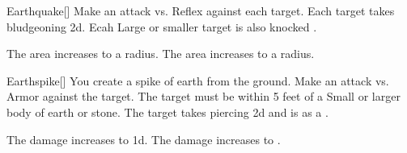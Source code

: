 \lowercase{\hypertarget{spell:Earthquake}{}}\label{spell:Earthquake}
\begin{freeability}[Rank 3]{\hypertarget{spell:Earthquake}{Earthquake}}[]
Make an attack vs. Reflex against each target.
\hit Each target takes bludgeoning  \minus2d.
Ecah Large or smaller target is also knocked .

\rankline
{} The area increases to a \arealarge radius.
 The area increases to a \areahuge radius.
\end{freeability}
\vspace{0.25em}



\lowercase{\hypertarget{spell:Earthspike}{}}\label{spell:Earthspike}
\begin{freeability}[Rank 3]{\hypertarget{spell:Earthspike}{Earthspike}}[]
You create a spike of earth from the ground.
Make an attack vs. Armor against the target.
The target must be within 5 feet of a Small or larger body of earth or stone.
\hit The target takes piercing  \minus2d and is  as a .

\rankline
{} The damage increases to  \minus1d.
 The damage increases to .
\end{freeability}
\vspace{0.25em}



